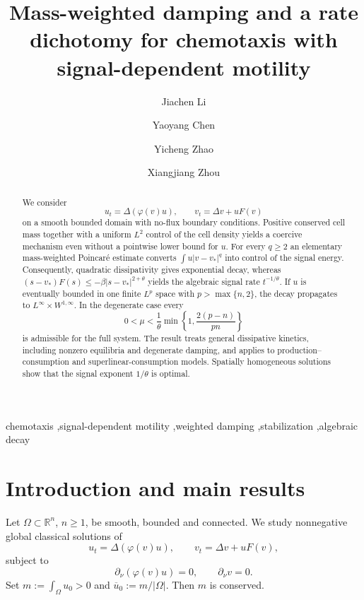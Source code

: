 \documentclass[final,5p,times,twocolumn]{elsarticle}
\newcommand{\Om}{\Omega}
\newcommand{\R}{\mathbb R}
\newcommand{\ubar}{\overline u_0}
\begin{document}
\begin{frontmatter}

\title{Mass-weighted damping and a rate dichotomy for chemotaxis with signal-dependent motility}
\author[aff1]{Jiachen Li}
\author[aff1]{Yaoyang Chen}
\author[aff1]{Yicheng Zhao}
\author[aff1]{Xiangjiang Zhou}
\address[aff1]{School of Mathematics and Statistics, Chongqing University of Posts and Telecommunications, Chongqing, China}

\begin{abstract}
We consider
\[
u_t=\Delta(\varphi(v)u),\qquad v_t=\Delta v+uF(v)
\]
on a smooth bounded domain with no-flux boundary conditions. Positive conserved cell mass together with a uniform $L^2$ control of the cell density yields a coercive mechanism even without a pointwise lower bound for $u$. For every $q\ge2$ an elementary mass-weighted Poincar\'e estimate converts $\int u|v-v_*|^q$ into control of the signal energy. Consequently, quadratic dissipativity gives exponential decay, whereas $(s-v_*)F(s)\le-\beta|s-v_*|^{2+\theta}$ yields the algebraic signal rate $t^{-1/\theta}$. If $u$ is eventually bounded in one finite $L^p$ space with $p>\max\{n,2\}$, the decay propagates to $L^\infty\times W^{1,\infty}$. In the degenerate case every
\[
0<\mu<\frac1\theta\min\left\{1,\frac{2(p-n)}{pn}\right\}
\]
is admissible for the full system. The result treats general dissipative kinetics, including nonzero equilibria and degenerate damping, and applies to production--consumption and superlinear-consumption models. Spatially homogeneous solutions show that the signal exponent $1/\theta$ is optimal.
\end{abstract}

\begin{keyword}
chemotaxis \sep signal-dependent motility \sep weighted damping \sep stabilization \sep algebraic decay
\end{keyword}
\end{frontmatter}

\section{Introduction and main results}
Let $\Om\subset\R^n$, $n\ge1$, be smooth, bounded and connected. We study nonnegative global classical solutions of
\begin{equation}\label{sys}
 u_t=\Delta(\varphi(v)u),\qquad v_t=\Delta v+uF(v),
\end{equation}
subject to
\begin{equation}\label{bc}
 \partial_\nu(\varphi(v)u)=0,\qquad \partial_\nu v=0.
\end{equation}
Set $m:=\int_\Om u_0>0$ and $\ubar:=m/|\Om|$. Then $m$ is conserved.
\end{document}
